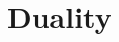 \documentclass[11pt]{article}
\numberwithin{equation}{section}
\numberwithin{equation}{subsection}
\newcommand{\twoj}{\nu}
\begin{document}

 



\section{Duality}\label{sectionDuality}
\end{document}

